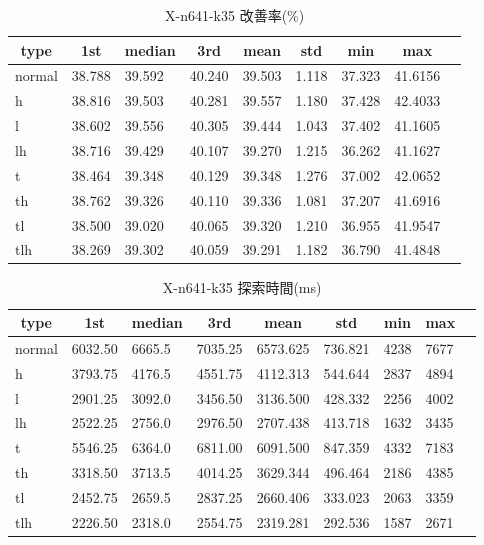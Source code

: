 \begin{table}[htbp]
    \caption{X-n641-k35 改善率(\%)}
    \begin{tabular}{|l|l|l|l|l|l|l|l|l|}\hline
    \multicolumn{1}{|c|}{\textbf{type}}
    &\multicolumn{1}{|c|}{\textbf{1st}}
    &\multicolumn{1}{c|}{\textbf{median}}
    &\multicolumn{1}{c|}{\textbf{3rd}}
    &\multicolumn{1}{c|}{\textbf{mean}}
    &\multicolumn{1}{c|}{\textbf{std}}
    &\multicolumn{1}{c|}{\textbf{min}}
    &\multicolumn{1}{c|}{\textbf{max}}\\\hline
	normal & 38.788 & 39.592 & 40.240 & 39.503 & 1.118 & 37.323 & 41.6156\\\hline
	h & 38.816 & 39.503 & 40.281 & 39.557 & 1.180 & 37.428 & 42.4033\\\hline
	l & 38.602 & 39.556 & 40.305 & 39.444 & 1.043 & 37.402 & 41.1605\\\hline
	lh & 38.716 & 39.429 & 40.107 & 39.270 & 1.215 & 36.262 & 41.1627\\\hline
	t & 38.464 & 39.348 & 40.129 & 39.348 & 1.276 & 37.002 & 42.0652\\\hline
	th & 38.762 & 39.326 & 40.110 & 39.336 & 1.081 & 37.207 & 41.6916\\\hline
	tl & 38.500 & 39.020 & 40.065 & 39.320 & 1.210 & 36.955 & 41.9547\\\hline
	tlh & 38.269 & 39.302 & 40.059 & 39.291 & 1.182 & 36.790 & 41.4848\\\hline
	\end{tabular}
\end{table}
\begin{table}[htbp]
    \caption{X-n641-k35 探索時間(ms)}
    \begin{tabular}{|l|l|l|l|l|l|l|l|l|}\hline
    \multicolumn{1}{|c|}{\textbf{type}}
    &\multicolumn{1}{|c|}{\textbf{1st}}
    &\multicolumn{1}{c|}{\textbf{median}}
    &\multicolumn{1}{c|}{\textbf{3rd}}
    &\multicolumn{1}{c|}{\textbf{mean}}
    &\multicolumn{1}{c|}{\textbf{std}}
    &\multicolumn{1}{c|}{\textbf{min}}
    &\multicolumn{1}{c|}{\textbf{max}}\\\hline
	normal & 6032.50 & 6665.5 & 7035.25 & 6573.625 & 736.821 & 4238 & 7677\\\hline
	h & 3793.75 & 4176.5 & 4551.75 & 4112.313 & 544.644 & 2837 & 4894\\\hline
	l & 2901.25 & 3092.0 & 3456.50 & 3136.500 & 428.332 & 2256 & 4002\\\hline
	lh & 2522.25 & 2756.0 & 2976.50 & 2707.438 & 413.718 & 1632 & 3435\\\hline
	t & 5546.25 & 6364.0 & 6811.00 & 6091.500 & 847.359 & 4332 & 7183\\\hline
	th & 3318.50 & 3713.5 & 4014.25 & 3629.344 & 496.464 & 2186 & 4385\\\hline
	tl & 2452.75 & 2659.5 & 2837.25 & 2660.406 & 333.023 & 2063 & 3359\\\hline
	tlh & 2226.50 & 2318.0 & 2554.75 & 2319.281 & 292.536 & 1587 & 2671\\\hline
	\end{tabular}
\end{table}
